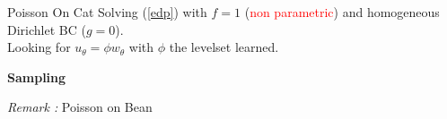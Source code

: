 \begin{frame}{Poisson On Cat}	
	 Solving (\ref{edp}) with $f=1$ (\textcolor{red}{non parametric}) and homogeneous Dirichlet BC ($g=0$). \\
	 Looking for $u_\theta = \phi w_\theta$ with $\phi$ the levelset learned. 
	
	\begin{center}
		\begin{minipage}{0.32\linewidth}
			\textbf{Sampling}
			
			\vspace{-10pt}
			\centering
		\end{minipage} \qquad 
		\begin{minipage}{0.32\linewidth}
			\centering
		\end{minipage} 
	\end{center}

	\begin{center}
	\end{center}

	\footnotesize
	\textit{Remark :} Poisson on Bean 
\end{frame}